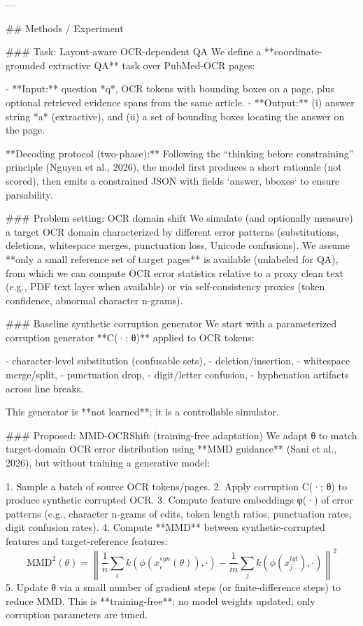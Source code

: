---

## Methods / Experiment  

### Task: Layout-aware OCR-dependent QA  
We define a **coordinate-grounded extractive QA** task over PubMed-OCR pages:

- **Input:** question *q*, OCR tokens with bounding boxes on a page, plus optional retrieved evidence spans from the same article.  
- **Output:** (i) answer string *a* (extractive), and (ii) a set of bounding boxes locating the answer on the page.

**Decoding protocol (two-phase):**  
Following the “thinking before constraining” principle (Nguyen et al., 2026), the model first produces a short rationale (not scored), then emits a constrained JSON with fields `{answer, bboxes}` to ensure parsability.

### Problem setting: OCR domain shift  
We simulate (and optionally measure) a target OCR domain characterized by different error patterns (substitutions, deletions, whitespace merges, punctuation loss, Unicode confusions). We assume **only a small reference set of target pages** is available (unlabeled for QA), from which we can compute OCR error statistics relative to a proxy clean text (e.g., PDF text layer when available) or via self-consistency proxies (token confidence, abnormal character n-grams).

### Baseline synthetic corruption generator  
We start with a parameterized corruption generator **C(·; θ)** applied to OCR tokens:

- character-level substitution (confusable sets),  
- deletion/insertion,  
- whitespace merge/split,  
- punctuation drop,  
- digit/letter confusion,  
- hyphenation artifacts across line breaks.

This generator is **not learned**; it is a controllable simulator.

### Proposed: MMD-OCRShift (training-free adaptation)  
We adapt θ to match target-domain OCR error distribution using **MMD guidance** (Sani et al., 2026), but without training a generative model:

1. Sample a batch of source OCR tokens/pages.  
2. Apply corruption C(·; θ) to produce synthetic corrupted OCR.  
3. Compute feature embeddings φ(·) of error patterns (e.g., character n-grams of edits, token length ratios, punctuation rates, digit confusion rates).  
4. Compute **MMD** between synthetic-corrupted features and target-reference features:  
   \[
   \mathrm{MMD}^2(\theta)=\left\|\frac{1}{n}\sum_i k(\phi(x_i^{syn}(\theta)),\cdot)-\frac{1}{m}\sum_j k(\phi(x_j^{tgt}),\cdot)\right\|^2
   \]
5. Update θ via a small number of gradient steps (or finite-difference steps) to reduce MMD. This is **training-free**: no model weights updated; only corruption parameters are tuned.

